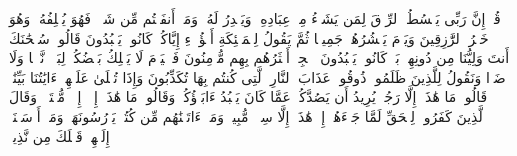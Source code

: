 \stopbuffer%
\startbuffer[\q:34:39]
قُلۡ إِنَّ رَبِّی یَبۡسُطُ ٱلرِّزۡقَ لِمَن یَشَاۤءُ مِنۡ عِبَادِهِۦ وَیَقۡدِرُ لَهُۥۚ وَمَاۤ أَنفَقۡتُم مِّن شَیۡءࣲ فَهُوَ یُخۡلِفُهُۥۖ وَهُوَ خَیۡرُ ٱلرَّٰزِقِینَ%
\stopbuffer%
\startbuffer[\q:34:40]
وَیَوۡمَ یَحۡشُرُهُمۡ جَمِیعࣰا ثُمَّ یَقُولُ لِلۡمَلَٰۤئِكَةِ أَهَٰۤؤُلَاۤءِ إِیَّاكُمۡ كَانُوا۟ یَعۡبُدُونَ%
\stopbuffer%
\startbuffer[\q:34:41]
قَالُوا۟ سُبۡحَٰنَكَ أَنتَ وَلِیُّنَا مِن دُونِهِمۖ بَلۡ كَانُوا۟ یَعۡبُدُونَ ٱلۡجِنَّۖ أَكۡثَرُهُم بِهِم مُّؤۡمِنُونَ%
\stopbuffer%
\startbuffer[\q:34:42]
فَٱلۡیَوۡمَ لَا یَمۡلِكُ بَعۡضُكُمۡ لِبَعۡضࣲ نَّفۡعࣰا وَلَا ضَرࣰّا وَنَقُولُ لِلَّذِینَ ظَلَمُوا۟ ذُوقُوا۟ عَذَابَ ٱلنَّارِ ٱلَّتِی كُنتُم بِهَا تُكَذِّبُونَ%
\stopbuffer%
\startbuffer[\q:34:43]
وَإِذَا تُتۡلَىٰ عَلَیۡهِمۡ ءَایَٰتُنَا بَیِّنَٰتࣲ قَالُوا۟ مَا هَٰذَاۤ إِلَّا رَجُلࣱ یُرِیدُ أَن یَصُدَّكُمۡ عَمَّا كَانَ یَعۡبُدُ ءَابَاۤؤُكُمۡ وَقَالُوا۟ مَا هَٰذَاۤ إِلَّاۤ إِفۡكࣱ مُّفۡتَرࣰىۚ وَقَالَ ٱلَّذِینَ كَفَرُوا۟ لِلۡحَقِّ لَمَّا جَاۤءَهُمۡ إِنۡ هَٰذَاۤ إِلَّا سِحۡرࣱ مُّبِینࣱ%
\stopbuffer%
\startbuffer[\q:34:44]
وَمَاۤ ءَاتَیۡنَٰهُم مِّن كُتُبࣲ یَدۡرُسُونَهَاۖ وَمَاۤ أَرۡسَلۡنَاۤ إِلَیۡهِمۡ قَبۡلَكَ مِن نَّذِیرࣲ%
\stopbuffer%

